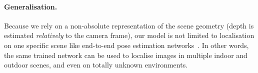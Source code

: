 \paragraph{Generalisation.} Because we rely on a non-absolute representation of the scene geometry (depth is estimated \textit{relatively} to the camera frame), our model is not limited to localisation on one specific scene like end-to-end pose estimation networks~\citep{Kendall2017, Brachmann2017b}. In other words, the same trained network can be used to localise images in multiple indoor and outdoor scenes, and even on totally unknown environments. 